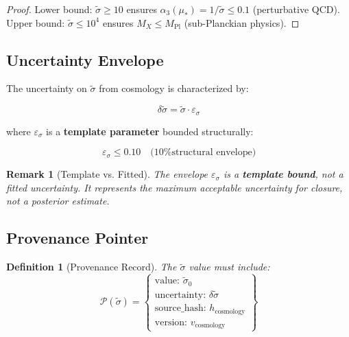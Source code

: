 \documentclass[11pt,letterpaper]{article}
\newtheorem{definition}[theorem]{Definition}
\newtheorem{remark}[theorem]{Remark}
\newcommand{\st}{\tilde{\sigma}}
\newcommand{\eps}{\varepsilon}
\begin{document}
\begin{proof}
Lower bound: $\st \geq 10$ ensures $\alpha_3(\mu_*) = 1/\st \leq 0.1$ (perturbative QCD).
Upper bound: $\st \leq 10^4$ ensures $M_X \leq M_{\text{Pl}}$ (sub-Planckian physics).
\end{proof}

\subsection{Uncertainty Envelope}
\label{subsec:uncertainty-envelope}

The uncertainty on $\st$ from cosmology is characterized by:

\begin{equation}
\delta\st = \st \cdot \eps_\sigma
\label{eq:sigma-uncertainty}
\end{equation}

where $\eps_\sigma$ is a \textbf{template parameter} bounded structurally:

\begin{equation}
\eps_\sigma \leq 0.10 \quad \text{(10\% structural envelope)}
\label{eq:eps-sigma-bound}
\end{equation}

\begin{remark}[Template vs. Fitted]
\label{rem:template-not-fitted}
The envelope $\eps_\sigma$ is a \textbf{template bound}, not a fitted uncertainty.
It represents the maximum acceptable uncertainty for closure, not a posterior estimate.
\end{remark}

\subsection{Provenance Pointer}
\label{subsec:provenance}

\begin{definition}[Provenance Record]
\label{def:provenance}
The $\st$ value must include:
\begin{equation}
\mathcal{P}(\st) = \left\{
\begin{array}{l}
\text{value: } \st_0 \\
\text{uncertainty: } \delta\st \\
\text{source\_hash: } h_{\text{cosmology}} \\
\text{version: } v_{\text{cosmology}}
\end{array}
\right\}
\label{eq:provenance-record}
\end{equation}
\end{definition}
\end{document}
